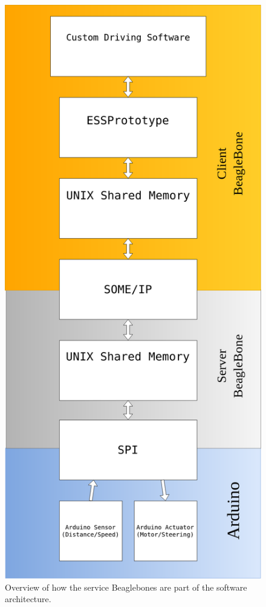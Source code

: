 \documentclass[11pt, titlepage]{article} %
\begin{document}
\begin{figure}[H]
	\centering
   	\includegraphics[scale=0.25]{arch_bbb.png}
   	\caption{Overview of how the service Beaglebones are part of the software architecture.}
    \label{fig:bbb_arch}
\end{figure}
\end{document}
